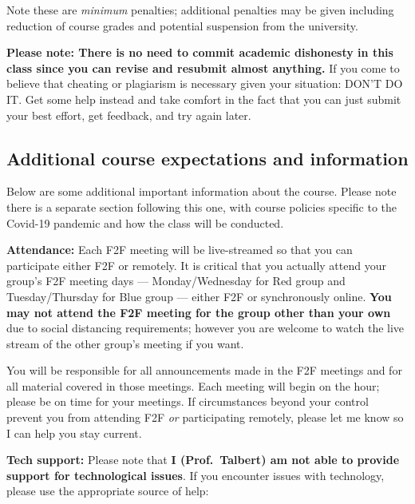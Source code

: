 \documentclass[]{article}
\begin{document}
Note these are \emph{minimum} penalties; additional penalties may be
given including reduction of course grades and potential suspension from
the university.

\textbf{Please note: There is no need to commit academic dishonesty in
this class since you can revise and resubmit almost anything.} If you
come to believe that cheating or plagiarism is necessary given your
situation: DON'T DO IT. Get some help instead and take comfort in the
fact that you can just submit your best effort, get feedback, and try
again later.

\hypertarget{additional-course-expectations-and-information}{%
\subsection{Additional course expectations and
information}\label{additional-course-expectations-and-information}}

Below are some additional important information about the course. Please
note there is a separate section following this one, with course
policies specific to the Covid-19 pandemic and how the class will be
conducted.

\textbf{Attendance:} Each F2F meeting will be live-streamed so that you
can participate either F2F or remotely. It is critical that you actually
attend your group's F2F meeting days --- Monday/Wednesday for Red group
and Tuesday/Thursday for Blue group --- either F2F or synchronously
online. \textbf{You may not attend the F2F meeting for the group other
than your own} due to social distancing requirements; however you are
welcome to watch the live stream of the other group's meeting if you
want.

You will be responsible for all announcements made in the F2F meetings
and for all material covered in those meetings. Each meeting will begin
on the hour; please be on time for your meetings. If circumstances
beyond your control prevent you from attending F2F \emph{or}
participating remotely, please let me know so I can help you stay
current.

\textbf{Tech support:} Please note that \textbf{I (Prof.~Talbert) am not
able to provide support for technological issues}. If you encounter
issues with technology, please use the appropriate source of help:
\end{document}
